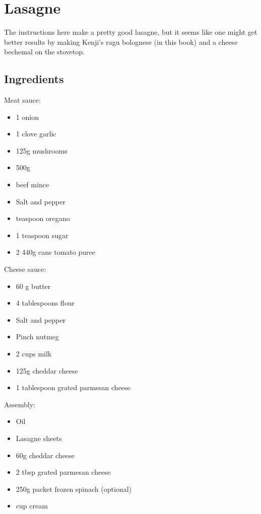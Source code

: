 \clearpage
\section{Lasagne}


The instructions here make a pretty good lasagne, but it seems like one might get better results by making Kenji's ragu bolognese (in this book) and a cheese bechemal on the stovetop.

\subsection{Ingredients}

Meat sauce:

\begin{itemize}
    \item 1 onion
    \item 1 clove garlic
    \item 125g mushrooms
    \item 500g
    \item beef mince
    \item Salt and pepper
    \item {} teaspoon oregano
    \item 1 teaspoon sugar
    \item 2 440g cans tomato puree
\end{itemize}

Cheese sauce:

\begin{itemize}
    \item 60 g butter
    \item 4 tablespoons flour
    \item Salt and pepper
    \item Pinch nutmeg
    \item 2 cups milk
    \item 125g cheddar cheese
    \item 1 tablespoon grated parmesan cheese
\end{itemize}

Assembly:

\begin{itemize}
    \item Oil
    \item Lasagne sheets
    \item 60g cheddar cheese
    \item 2 tbsp grated parmesan cheese
    \item 250g packet frozen spinach (optional)
    \item {} cup cream
\end{itemize}

